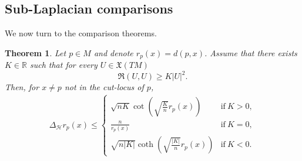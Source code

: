 \documentclass[11pt]{article}
\numberwithin{equation}{section}
\newtheorem{theorem}{Theorem}[section]
\newcommand{\Ho}{\mathcal H}
\begin{document}
\subsection{Sub-Laplacian comparisons}

We now turn to the comparison theorems.

\begin{theorem}\label{comparison laplacian}
Let $p \in M$ and denote $r_p(x)=d(p,x)$. Assume that there exists $K \in \mathbb{R}$ such that for every $U \in \mathfrak{X}(TM)$
\[
\mathfrak{R}(U,U) \ge K |U|^2.
\] 
Then, for $x\neq p$ not in the  cut-locus of $p$,
\begin{align*}
\Delta_\Ho r_p (x) \le 
\begin{cases}
 \sqrt { nK} \cot\left(\sqrt { \frac{K}{n}} r_p(x) \right) &\text{if}\ K>0,
\\
\displaystyle\frac{n}{r_p(x)} &\text{if}\ K = 0,
\\
 \sqrt{n |K|} \coth\left(\sqrt{\frac{|K|}{n}} r_p(x)\right) &\text{if}\ K<0.
\end{cases}
\end{align*}

\end{theorem}
\end{document}
